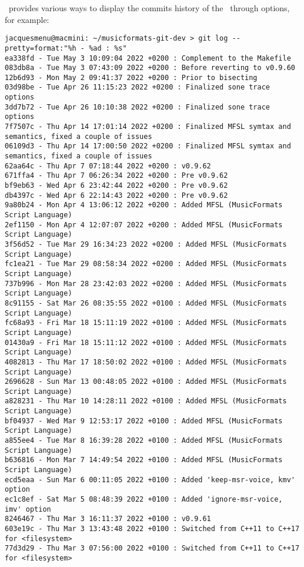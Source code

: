 \git\ provides various ways to display the commits history of the \repo\ through  options, for example:
\begin{lstlisting}[language=Terminal]
jacquesmenu@macmini: ~/musicformats-git-dev > git log --pretty=format:"%h - %ad : %s"
ea338fd - Tue May 3 10:09:04 2022 +0200 : Complement to the Makefile
083db8a - Tue May 3 07:43:09 2022 +0200 : Before reverting to v0.9.60
12b6d93 - Mon May 2 09:41:37 2022 +0200 : Prior to bisecting
03d98be - Tue Apr 26 11:15:23 2022 +0200 : Finalized sone trace options
3dd7b72 - Tue Apr 26 10:10:38 2022 +0200 : Finalized sone trace options
7f7507c - Thu Apr 14 17:01:14 2022 +0200 : Finalized MFSL symtax and semantics, fixed a couple of issues
06109d3 - Thu Apr 14 17:00:50 2022 +0200 : Finalized MFSL symtax and semantics, fixed a couple of issues
62aa64c - Thu Apr 7 07:18:44 2022 +0200 : v0.9.62
671ffa4 - Thu Apr 7 06:26:34 2022 +0200 : Pre v0.9.62
bf9eb63 - Wed Apr 6 23:42:44 2022 +0200 : Pre v0.9.62
db4397c - Wed Apr 6 22:14:43 2022 +0200 : Pre v0.9.62
9a80b24 - Mon Apr 4 13:06:12 2022 +0200 : Added MFSL (MusicFormats Script Language)
2ef1150 - Mon Apr 4 12:07:07 2022 +0200 : Added MFSL (MusicFormats Script Language)
3f56d52 - Tue Mar 29 16:34:23 2022 +0200 : Added MFSL (MusicFormats Script Language)
fc1ea21 - Tue Mar 29 08:58:34 2022 +0200 : Added MFSL (MusicFormats Script Language)
737b996 - Mon Mar 28 23:42:03 2022 +0200 : Added MFSL (MusicFormats Script Language)
8c91155 - Sat Mar 26 08:35:55 2022 +0100 : Added MFSL (MusicFormats Script Language)
fc68a93 - Fri Mar 18 15:11:19 2022 +0100 : Added MFSL (MusicFormats Script Language)
01430a9 - Fri Mar 18 15:11:12 2022 +0100 : Added MFSL (MusicFormats Script Language)
4082813 - Thu Mar 17 18:50:02 2022 +0100 : Added MFSL (MusicFormats Script Language)
2696628 - Sun Mar 13 00:48:05 2022 +0100 : Added MFSL (MusicFormats Script Language)
a828231 - Thu Mar 10 14:28:11 2022 +0100 : Added MFSL (MusicFormats Script Language)
bf04937 - Wed Mar 9 12:53:17 2022 +0100 : Added MFSL (MusicFormats Script Language)
a855ee4 - Tue Mar 8 16:39:28 2022 +0100 : Added MFSL (MusicFormats Script Language)
b636816 - Mon Mar 7 14:49:54 2022 +0100 : Added MFSL (MusicFormats Script Language)
ecd5eaa - Sun Mar 6 00:11:05 2022 +0100 : Added 'keep-msr-voice, kmv' option
ec1c8ef - Sat Mar 5 08:48:39 2022 +0100 : Added 'ignore-msr-voice, imv' option
8246467 - Thu Mar 3 16:11:37 2022 +0100 : v0.9.61
603e19c - Thu Mar 3 13:43:48 2022 +0100 : Switched from C++11 to C++17 for <filesystem>
77d3d29 - Thu Mar 3 07:56:00 2022 +0100 : Switched from C++11 to C++17 for <filesystem>

\end{lstlisting}
